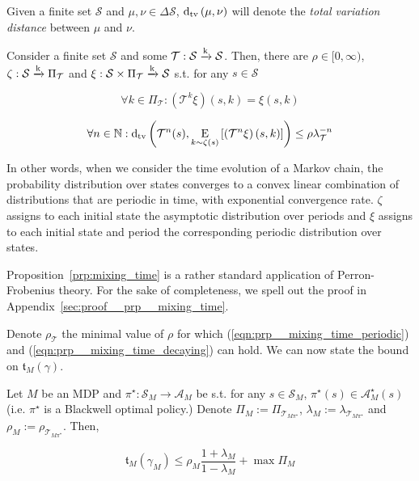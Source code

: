 \documentclass[anon,12pt]{colt2018} %
\newcommand{\AP}[1]{\left(#1\right)}
\newcommand{\AB}[1]{\left[#1\right]}
\newcommand{\Ea}[2]{\underset{#1}{\operatorname{E}}\AB{#2}}
\newcommand{\Dtva}[1]{\operatorname{d}_{\textnormal{tv}}\AP{#1}}
\newcommand{\Nats}{\mathbb{N}}
\newcommand{\K}{\xrightarrow{\textnormal{k}}}
\newcommand{\A}{\mathcal{A}}
\newcommand{\St}{\mathcal{S}}
\newcommand{\T}{\mathcal{T}}
\newcommand{\Tn}{\mathfrak{t}}
\begin{document}
Given a finite set $\St$ and $\mu,\nu \in \Delta\St$, $\Dtva{\mu,\nu}$ will denote the \emph{total variation distance} between $\mu$ and $\nu$.

\begin{samepage}
\begin{proposition}
\label{prp:mixing_time}

Consider a finite set $\St$ and some $\T: \St \K \St$. Then, there are $\rho\in[0,\infty)$, $\zeta: \St \K \Pi_\T$ and $\xi: \St \times \Pi_\T \K \St$ s.t. for any $s\in\St$

\begin{equation}
\label{eqn:prp__mixing_time_periodic}
\forall k \in \Pi_\T: \AP{\T^k\xi}(s,k) = \xi(s,k)
\end{equation}

\begin{equation}
\label{eqn:prp__mixing_time_decaying}
\forall n \in \Nats: \Dtva{\T^n(s),\Ea{k\sim\zeta(s)}{\AP{\T^n\xi}(s,k)}} \leq \rho\lambda_\T^{-n}
\end{equation}

\end{proposition}
\end{samepage}

In other words, when we consider the time evolution of a Markov chain, the probability distribution over states converges to a convex linear combination of distributions that are periodic in time, with exponential convergence rate. $\zeta$ assigns to each initial state the asymptotic distribution over periods and $\xi$ assigns to each initial state and period the corresponding periodic distribution over states.

Proposition~\ref{prp:mixing_time} is a rather standard application of Perron-Frobenius theory. For the sake of completeness, we spell out the proof in Appendix~\ref{sec:proof__prp__mixing_time}.

Denote $\rho_\T$ the minimal value of $\rho$ for which (\ref{eqn:prp__mixing_time_periodic}) and (\ref{eqn:prp__mixing_time_decaying}) can hold. We can now state the bound on $\Tn_M(\gamma)$.

\begin{samepage}
\begin{proposition}
\label{prp:transient}

Let $M$ be an MDP and $\pi^\star: \St_M \rightarrow \A_M$ be s.t. for any $s \in \St_M$, $\pi^\star(s)\in\A_M^\star(s)$ (i.e. $\pi^\star$ is a Blackwell optimal policy.) Denote $\Pi_M:=\Pi_{\T_{M\pi^\star}}$, $\lambda_M:=\lambda_{\T_{M\pi^\star}}$ and $\rho_M:=\rho_{\T_{M\pi^\star}}$. Then,

\begin{equation}
\Tn_M\AP{\gamma_M} \leq \rho_M \frac{1+\lambda_M}{1-\lambda_M} + \max{\Pi_M}
\end{equation}

\end{proposition}
\end{samepage}
\end{document}
